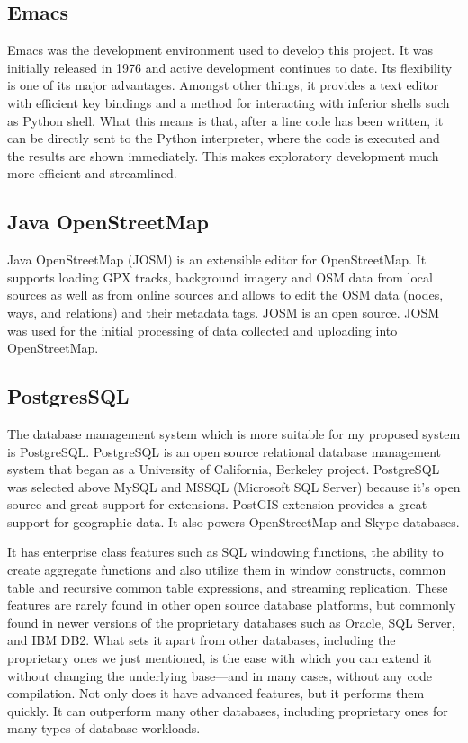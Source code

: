 \documentclass[oneside,12pt]{book}
\begin{document}
\subsection{Emacs}
Emacs was the development environment used to develop this project. It was initially released in 1976 and active development continues to date. Its flexibility is one of its major advantages. Amongst other things, it provides a text editor with efficient key bindings and a method for interacting with inferior shells such as Python shell. What this means is that, after a line code has been written, it can be directly sent to the Python interpreter, where the code is executed and the results are shown immediately. This makes exploratory development much more efficient and streamlined. 

\subsection{Java OpenStreetMap}
Java OpenStreetMap (JOSM) is an extensible editor for OpenStreetMap. It supports loading GPX tracks, background imagery and OSM data from local sources as well as from online sources and allows to edit the OSM data (nodes, ways, and relations) and their metadata tags. JOSM is an open source. JOSM was used for the initial processing of data collected and uploading into OpenStreetMap.

\subsection{PostgresSQL}
The database management system which is more suitable for my proposed system is PostgreSQL. PostgreSQL is an open source relational database management system that began as a University of California, Berkeley project. PostgreSQL was selected above MySQL and MSSQL (Microsoft SQL Server) because it's open source and great support for extensions. PostGIS extension provides a great support for geographic data. It also powers OpenStreetMap and Skype databases.

It has enterprise class features such as SQL windowing functions, the ability to create aggregate functions and also utilize them in window constructs, common table and
recursive common table expressions, and streaming replication. These features are rarely found in other open source database platforms, but commonly found in newer versions of the proprietary databases such as Oracle, SQL Server, and IBM DB2. What sets it apart from other databases, including the proprietary ones we just mentioned,
is the ease with which you can extend it without changing the underlying base—and in many cases, without any code compilation. Not only does it have advanced features,
but it performs them quickly. It can outperform many other databases, including proprietary ones for many types of database workloads.
\end{document}

